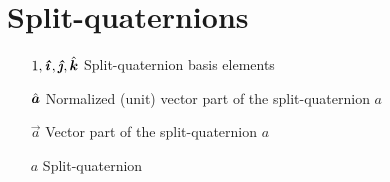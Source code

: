 \section*{Split-quaternions}
\begin{itemize}[itemsep=0pt, leftmargin=2cm, labelsep=0cm, labelwidth=1.9cm, align=left]
%
    \item[$1,\quati,\quatj,\quatk$] Split-quaternion basis elements
    \item[$\uvec{a}$] Normalized (unit) vector part of the split-quaternion \(a\)
    \item[$\vec{a}$] Vector part of the split-quaternion \(a\)
    \item[$a$] Split-quaternion
%
%
%
\end{itemize}